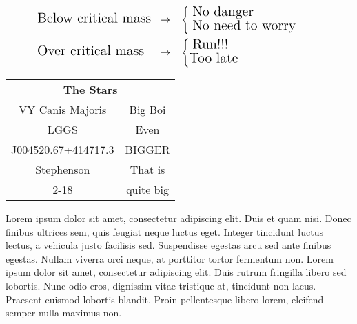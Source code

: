 \documentclass[final]{beamer}
\begin{document}
\begin{frame}
\begin{multicols}{3}
\noindent
\begin{center}
  \noindent
  \colorbox{marronrp3}{
    \begin{minipage}[t]{.96\linewidth}
      \begin{align*}
        & \text{\Large Below critical mass}
        &\to \quad
        &\begin{cases}
          \text{ \Large No danger }\\
          \text{ \Large No need to worry }
        \end{cases}
        &
        \\
        &\text{\Large Over critical mass }
        &\to \quad
        &\begin{cases}
          \text{ \Large Run!!!}\\
          \text{\Large  Too late }
        \end{cases}
        &
      \end{align*}
    \end{minipage}
  }
\end{center}

\begin{center}  
\vspace{.5cm}

\Large
\begin{tabular}[t]{c|c}
  \multicolumn{2}{c}{\huge \textbf{The Stars}}
  \vspace{.3cm}
  \\
  VY Canis Majoris& Big Boi\\
  \hline
  LGGS &Even\\
  J004520.67+414717.3 &BIGGER\\
  \hline
  Stephenson & That is \\
  2-18 & quite big
\end{tabular}

\end{center}


  
\columnbreak
Lorem ipsum dolor sit amet, consectetur adipiscing elit. Duis et quam nisi. Donec finibus ultrices sem, quis feugiat neque luctus eget. Integer tincidunt luctus lectus, a vehicula justo facilisis sed. 
Suspendisse egestas arcu sed ante finibus egestas. Nullam viverra orci neque, at porttitor tortor fermentum non. Lorem ipsum dolor sit amet, consectetur adipiscing elit. 
Duis rutrum fringilla libero sed lobortis. Nunc odio eros, dignissim vitae tristique at, tincidunt non lacus. Praesent euismod lobortis blandit.
Proin pellentesque libero lorem, eleifend semper nulla maximus non.\cite{kowal2}


\end{multicols}
\end{frame}
\end{document}
